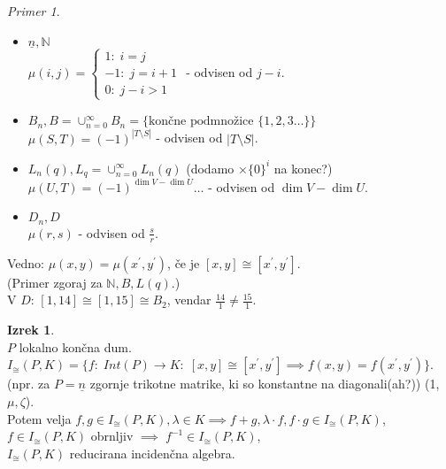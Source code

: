 \documentclass[a4paper, 12pt]{book}
\theoremstyle{definition}
\newtheorem{theorem}[counter]{Izrek}
\theoremstyle{remark}
\newtheorem*{ex}{Primer}
\newcommand{\N}{\mathbb{N}}
\begin{document}
\begin{ex} \text{} \\
  \begin{itemize}
    \item $\underline{n}, \N$ \\
      $\mu(i, j) = \begin{cases}1: \; i=j \\ -1: \; j = i+1 \\ 0: \; j-i > 1\end{cases}$ - odvisen od $j-i$.
    \item $B_n, B = \cup_{n=0}^{\infty} B_n = \{\text{končne podmnožice } \{1, 2, 3 \dots\}\}$ \\
      $\mu(S, T) = (-1)^{|T \setminus S|}$ - odvisen od $|T \setminus S|$.
    \item $L_n(q), L_q = \cup_{n=0}^{\infty} L_n(q)$ (dodamo $\times \{0\}^i$ na konec?) \\
      $\mu(U, T) = (-1)^{\dim V - \dim U} \dots$ - odvisen od $\dim V - \dim U$.
    \item $D_n, D$ \\
      $\mu(r, s)$ - odvisen od $\frac{s}{r}$.
  \end{itemize}
\end{ex}
Vedno: $\mu(x, y) = \mu(x^{'}, y^{'})$, če je $[x, y] \cong [x^{'}, y^{'}]$. \\
(Primer zgoraj za $\N, B, L(q)$.) \\
V $D$: $[1, 14] \cong [1, 15] \cong B_2$, vendar $\frac{14}{1} \neq \frac{15}{1}$.
\begin{theorem} \text{} \\
  $P$ lokalno končna dum. \\
  $I_{\cong}(P, K) = \{f: \; Int(P) \to K: \; [x,y] \cong [x^{'}, y^{'}] \implies f(x,y) = f(x^{'},y^{'})\}$. \\
  (npr. za $P = \underline{n}$ zgornje trikotne matrike, ki so konstantne na diagonali(ah?)) (1, $\mu, \zeta$). \\
  Potem velja $f, g \in I_{\cong}(P, K), \lambda \in K \implies
  f + g, \lambda \cdot f, f \cdot g \in I_{\cong}(P, K)$, \\
  $f \in I_{\cong}(P, K)$ obrnljiv $\implies \; f^{-1} \in I_{\cong}(P, K)$, \\
  $I_{\cong}(P, K)$ reducirana incidenčna algebra.
\end{theorem}
\end{document}
